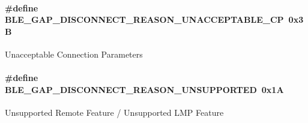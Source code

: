 \paragraph[{\texorpdfstring{B\+L\+E\+\_\+\+G\+A\+P\+\_\+\+D\+I\+S\+C\+O\+N\+N\+E\+C\+T\+\_\+\+R\+E\+A\+S\+O\+N\+\_\+\+U\+N\+A\+C\+C\+E\+P\+T\+A\+B\+L\+E\+\_\+\+CP}{BLE_GAP_DISCONNECT_REASON_UNACCEPTABLE_CP}}]{\setlength{\rightskip}{0pt plus 5cm}\#define B\+L\+E\+\_\+\+G\+A\+P\+\_\+\+D\+I\+S\+C\+O\+N\+N\+E\+C\+T\+\_\+\+R\+E\+A\+S\+O\+N\+\_\+\+U\+N\+A\+C\+C\+E\+P\+T\+A\+B\+L\+E\+\_\+\+CP~0x3B}\hypertarget{group___b_l_e___g_a_p___d_i_s_c_o_n_n_e_c_t___r_e_a_s_o_n_ga66abd41d71cc5b0395392b4ac81e467d}{}\label{group___b_l_e___g_a_p___d_i_s_c_o_n_n_e_c_t___r_e_a_s_o_n_ga66abd41d71cc5b0395392b4ac81e467d}
Unacceptable Connection Parameters 
\paragraph[{\texorpdfstring{B\+L\+E\+\_\+\+G\+A\+P\+\_\+\+D\+I\+S\+C\+O\+N\+N\+E\+C\+T\+\_\+\+R\+E\+A\+S\+O\+N\+\_\+\+U\+N\+S\+U\+P\+P\+O\+R\+T\+ED}{BLE_GAP_DISCONNECT_REASON_UNSUPPORTED}}]{\setlength{\rightskip}{0pt plus 5cm}\#define B\+L\+E\+\_\+\+G\+A\+P\+\_\+\+D\+I\+S\+C\+O\+N\+N\+E\+C\+T\+\_\+\+R\+E\+A\+S\+O\+N\+\_\+\+U\+N\+S\+U\+P\+P\+O\+R\+T\+ED~0x1A}\hypertarget{group___b_l_e___g_a_p___d_i_s_c_o_n_n_e_c_t___r_e_a_s_o_n_gacc04c49655d6f896e2e8a4485b39fb66}{}\label{group___b_l_e___g_a_p___d_i_s_c_o_n_n_e_c_t___r_e_a_s_o_n_gacc04c49655d6f896e2e8a4485b39fb66}
Unsupported Remote Feature / Unsupported L\+MP Feature 